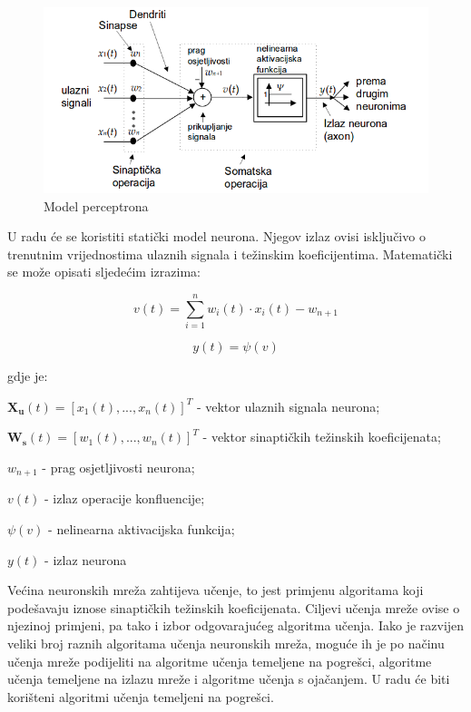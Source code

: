 \documentclass[times, utf8, diplomski]{fer}
\begin{document}
\begin{figure}[h]
\centering
\includegraphics[width=.9\textwidth]{neuron}
\caption{Model perceptrona}
\label{fig:neuron}
\end{figure}

U radu će se koristiti statički model neurona. Njegov izlaz ovisi isključivo o trenutnim vrijednostima ulaznih signala i težinskim koeficijentima. Matematički se može opisati sljedećim izrazima:

\begin{equation}
v(t) = \sum_{i=1}^{n}w_i(t)\cdot x_i(t) - w_{n+1}
\end{equation}

\begin{equation}
y(t) = \psi(v)
\end{equation}

gdje je:

$\bm{X_u}(t) = [x_1(t),...,x_n(t)]^T$ - vektor ulaznih signala neurona;

$\bm{W_s}(t) = [w_1(t),...,w_n(t)]^T$ - vektor sinaptičkih težinskih koeficijenata;

$w_{n+1}$ - prag osjetljivosti neurona;

$v(t)$ - izlaz operacije konfluencije;

$\psi(v)$ - nelinearna aktivacijska funkcija;

$y(t)$ - izlaz neurona

\vspace{5mm}

Većina neuronskih mreža zahtijeva učenje, to jest primjenu algoritama koji podešavaju iznose sinaptičkih težinskih koeficijenata. Ciljevi učenja mreže ovise o njezinoj primjeni, pa tako i izbor odgovarajućeg algoritma učenja. Iako je razvijen veliki broj raznih
algoritama učenja neuronskih mreža, moguće ih je po načinu učenja mreže podijeliti na algoritme učenja temeljene na pogrešci, algoritme učenja temeljene na izlazu mreže i algoritme učenja s ojačanjem. U radu će biti korišteni algoritmi učenja temeljeni na pogrešci.
\end{document}
